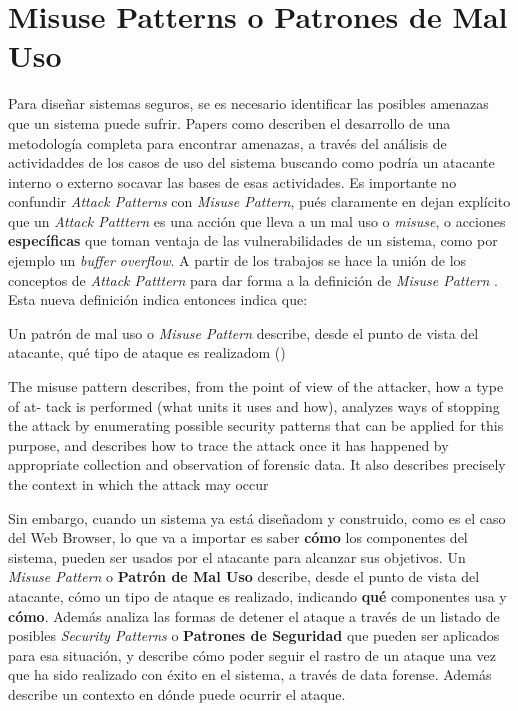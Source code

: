 \section{Misuse Patterns o Patrones de Mal Uso}
Para diseñar sistemas seguros, se es necesario identificar las posibles amenazas que un sistema puede sufrir. Papers como \cite{fernandez2013security, fernandez2006defining, fernandez2007attack, braz2008eliciting} describen el desarrollo de una metodología completa para encontrar amenazas, a través del análisis de actividaddes de los casos de uso del sistema buscando como podría un atacante interno o externo socavar las bases de esas actividades. Es importante no confundir \textit{Attack Patterns} con \textit{Misuse Pattern}, pués claramente en \cite{ModMisusePatt, fernandez2013security} dejan explícito que un \textit{Attack Patttern} es una acción que lleva a un mal uso o \textit{misuse}, o acciones \textbf{específicas} que toman ventaja de las vulnerabilidades de un sistema, como por ejemplo un \textit{buffer overflow}. A partir de los trabajos \cite{fernandez2007attack, yoshioka2006development, yoshioka2007integration}  se hace la unión de los conceptos de \textit{Attack Patttern} para dar forma a la definición de \textit{Misuse Pattern} \cite{ModMisusePatt, pelaez2009misuse, fernandez2010worm, hashizume2011misuse, munoz2011misuse, fernandez2012misuse, alkazimi2014, encinamisuse}. Esta nueva definición indica entonces indica que:
\begin{center}
	Un patrón de mal uso o \textit{Misuse Pattern} describe, desde el punto de vista del atacante, qué tipo de ataque es realizadom ()
\end{center}
The misuse pattern describes, from the point of view of the attacker, how a type of at-
tack is performed (what units it uses and how), analyzes ways of stopping the attack by
enumerating possible security patterns that can be applied for this purpose, and describes
how to trace the attack once it has happened by appropriate collection and observation
of forensic data. It also describes precisely the context in which the attack may occur



Sin embargo, cuando un sistema ya está diseñadom y construido, como es el caso del Web Browser, lo que va a importar es saber \textbf{cómo} los componentes del sistema, pueden ser usados por el atacante para alcanzar sus objetivos. Un \textit{Misuse Pattern} o \textbf{Patrón de Mal Uso} describe, desde el punto de vista del atacante, cómo un tipo de ataque es realizado, indicando \textbf{qué} componentes usa y \textbf{cómo}. Además analiza las formas de detener el ataque a través de un listado de posibles \textit{Security Patterns} o \textbf{Patrones de Seguridad} que pueden ser aplicados para esa situación, y describe cómo poder seguir el rastro de un ataque una vez que ha sido realizado con éxito en el sistema, a través de data forense. Además describe un contexto en dónde puede ocurrir el ataque.

